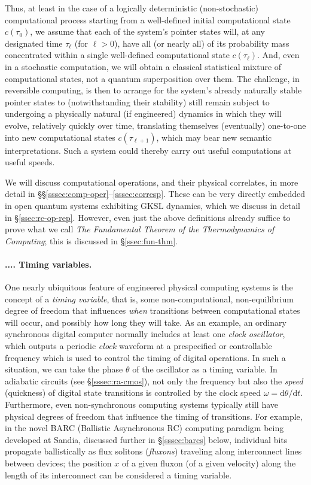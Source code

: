\documentclass[preprints,article,accept,moreauthors,pdftex]{Definitions/mdpi}
\newcommand{\mypara}[1]{\paragraph{\arabic{section}.\arabic{subsection}.\arabic{subsubsection}.\arabic{paragraph}. #1}}
\begin{document}
Thus, at least in the case of a logically deterministic (non-stochastic) computational process starting from a well-defined initial computational state $c(\tau_0)$, we assume that each of the system's pointer states will, at any designated time $\tau_\ell$ (for $\ell>0$), have all (or nearly all) of its probability mass concentrated within a single well-defined computational state $c(\tau_\ell)$. And, even in a stochastic computation, we will obtain a classical statistical mixture of computational states, not a quantum superposition over them.
The challenge, in reversible computing, is then to arrange for the system's already naturally stable pointer states to (notwithstanding their stability) still remain subject to undergoing a physically natural (if engineered) dynamics in which they will evolve, relatively quickly over time, translating themselves (eventually) one-to-one into new computational states $c(\tau_{\ell+1})$, which may bear new semantic interpretations. Such a system could thereby carry out useful computations at useful speeds. 

We will discuss computational operations, and their physical correlates, in more detail in \S\S\ref{sssec:comp-oper}--\ref{sssec:corresp}. These can be very directly embedded in open quantum systems exhibiting GKSL dynamics, which we discuss in detail in \S\ref{ssec:rc-op-rep}. 
However, even just the above definitions already suffice to prove what we call \emph{The Fundamental Theorem of the Thermodynamics of Computing}; this is discussed in \S\ref{ssec:fun-thm}.

\mypara{Timing variables.}\label{par:timing-vars}
One nearly ubiquitous feature of engineered physical computing systems is the concept of a \emph{timing variable}, that is, some non-computational, non-equilibrium degree of freedom that influences \emph{when} transitions between computational states will occur, and possibly how long they will take. As an example, an ordinary synchronous digital computer normally includes at least one \emph{clock oscillator}, which outputs a periodic \emph{clock} waveform at a prespecified or controllable frequency which is used to control the timing of digital operations. In such a situation, we can take the phase $\theta$ of the oscillator as a timing variable. In adiabatic circuits (see \S\ref{sssec:ra-cmos}), not only the frequency but also the \textit{speed} (quickness) of digital state transitions is controlled by the clock speed $\omega = \mathrm{d}\theta/\mathrm{d}t$.
Furthermore, even non-synchronous computing systems typically still have physical degrees of freedom that influence the timing of transitions. For example, in the novel BARC (Ballistic Asynchronous RC) computing paradigm being developed at Sandia, discussed further in \S\ref{sssec:barcs} below, individual bits propagate ballistically as flux solitons (\textit{fluxons}) traveling along interconnect lines between devices; the position $x$ of a given fluxon (of a given velocity) along the length of its interconnect can be considered a timing variable.
\end{document}
